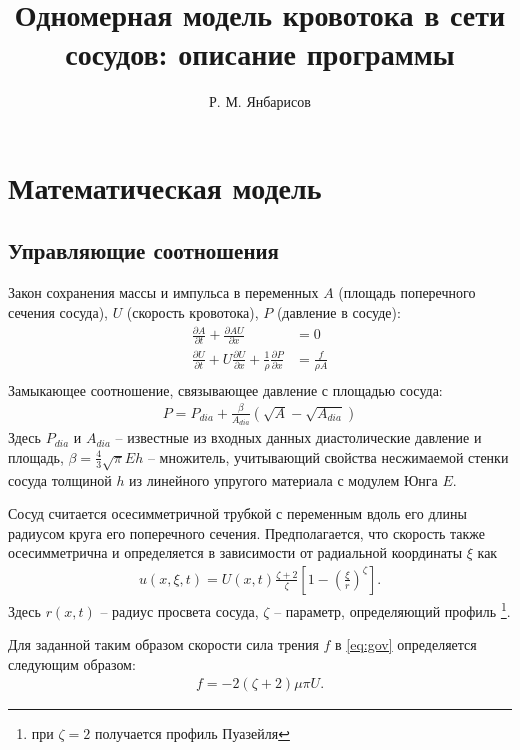 \documentclass[12pt]{article}
\title{Одномерная модель кровотока в сети сосудов: описание программы}
\author{Р. М. Янбарисов}
\date{}
\begin{document}
\maketitle

\section{Математическая модель}\label{sec:model}

\subsection{Управляющие соотношения}\label{sec:gov}

Закон сохранения массы и импульса в переменных $A$ (площадь поперечного сечения сосуда), $U$ (скорость кровотока), $P$ (давление в сосуде):
\begin{align}\label{eq:gov}
	\frac{\partial A}{\partial t} + \frac{\partial AU}{\partial x} &= 0 \\
	\frac{\partial U}{\partial t} + U \frac{\partial U}{\partial x} + \frac{1}{\rho}\frac{\partial P}{\partial x} &= \frac{f}{\rho A} \\
\end{align}
Замыкающее соотношение, связывающее давление с площадью сосуда:
\begin{align}\label{eq:pressure}
	P = P_{dia} + \frac{\beta}{A_{dia}} \left( \sqrt{A} - \sqrt{A_{dia}} \right)
\end{align}
Здесь $P_{dia}$ и $A_{dia}$ -- известные из входных данных диастолические давление и площадь, $\beta = \frac{4}{3} \sqrt{\pi} E h$ -- множитель, учитывающий свойства несжимаемой стенки сосуда толщиной $h$ из линейного упругого материала с модулем Юнга $E$.

Сосуд считается осесимметричной трубкой с переменным вдоль его длины радиусом круга его поперечного сечения.
Предполагается, что скорость также осесимметрична и определяется в зависимости от радиальной координаты $\xi$ как
\begin{align*}
	u(x,\xi,t) = U(x,t) \frac{\zeta+2}{\zeta} \left[ 1 - \left(\frac{\xi}{r}\right)^\zeta \right].
\end{align*}
Здесь $r(x,t)$ -- радиус просвета сосуда, $\zeta$ -- параметр, определяющий профиль \footnote{при $\zeta = 2$ получается профиль Пуазейля}.

Для заданной таким образом скорости сила трения $f$ в \eqref{eq:gov} определяется следующим образом:
\begin{align}\label{eq:friction}
	f = -2 (\zeta+2) \mu \pi U.
\end{align}
 
\end{document}
